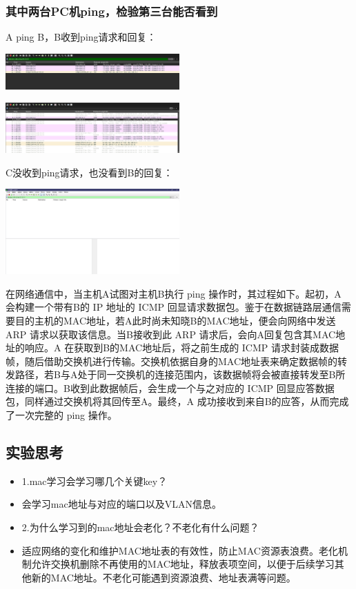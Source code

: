 \documentclass{article}
\begin{document}
\subsubsection{其中两台PC机ping，检验第三台能否看到}
A ping B，B收到ping请求和回复：

\vspace{10pt}
\centerline{\includegraphics[width=0.5\textwidth]{2_4_images/5.png}}
\vspace{10pt}

\vspace{10pt}
\centerline{\includegraphics[width=0.5\textwidth]{2_4_images/7.png}}
\vspace{10pt}
C没收到ping请求，也没看到B的回复：

\vspace{10pt}
\centerline{\includegraphics[width=0.5\textwidth]{2_4_images/6.png}}
\vspace{10pt}
在网络通信中，当主机A试图对主机B执行 ping 操作时，其过程如下。起初，A 会构建一个带有B的 IP 地址的 ICMP 回显请求数据包。鉴于在数据链路层通信需要目的主机的MAC地址，若A此时尚未知晓B的MAC地址，便会向网络中发送 ARP 请求以获取该信息。当B接收到此 ARP 请求后，会向A回复包含其MAC地址的响应。A 在获取到B的MAC地址后，将之前生成的 ICMP 请求封装成数据帧，随后借助交换机进行传输。交换机依据自身的MAC地址表来确定数据帧的转发路径，若B与A处于同一交换机的连接范围内，该数据帧将会被直接转发至B所连接的端口。B收到此数据帧后，会生成一个与之对应的 ICMP 回显应答数据包，同样通过交换机将其回传至A。最终，A 成功接收到来自B的应答，从而完成了一次完整的 ping 操作。
\subsection{实验思考}   
\begin{itemize}
    \item 1.mac学习会学习哪几个关键key？
    \item 会学习mac地址与对应的端口以及VLAN信息。
    \item 2.为什么学习到的mac地址会老化？不老化有什么问题？
    \item 适应网络的变化和维护MAC地址表的有效性，防止MAC资源表浪费。老化机制允许交换机删除不再使用的MAC地址，释放表项空间，以便于后续学习其他新的MAC地址。不老化可能遇到资源浪费、地址表满等问题。
\end{itemize}
\end{document}
